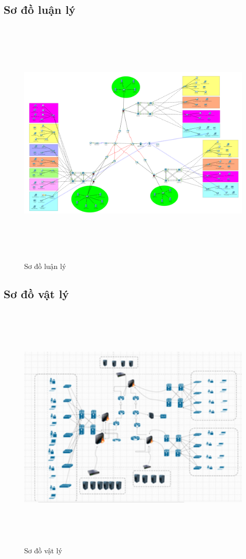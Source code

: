 \documentclass[12pt,a4paper]{report}
\begin{document}
\subsection{Sơ đồ luận lý}
\begin{figure}[H]
    \centering
    \includegraphics[width=16cm, height=12cm]{img/logic.png}
    \caption{Sơ đồ luận lý}
    \label{hinh21}
\end{figure}
\subsection{Sơ đồ vật lý}
\begin{figure}[H]
    \centering
    \includegraphics[width=16cm, height=12cm]{img/physical.png}
    \caption{Sơ đồ vật lý}
    \label{hinh22 }
\end{figure}
\end{document}
